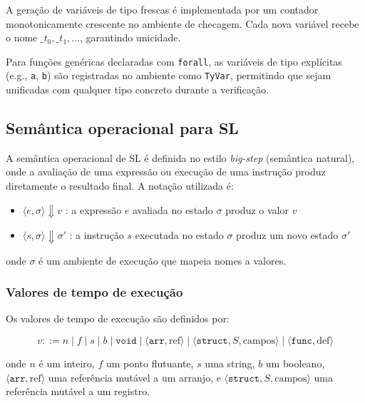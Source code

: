 \documentclass[12pt,a4paper]{article}
\begin{document}
A geração de variáveis de tipo frescas é implementada por um contador monotonicamente crescente no ambiente de checagem. Cada nova variável recebe o nome $\_t_0, \_t_1, \ldots$, garantindo unicidade.

Para funções genéricas declaradas com \texttt{forall}, as variáveis de tipo explícitas (e.g., \texttt{a}, \texttt{b}) são registradas no ambiente como \texttt{TyVar}, permitindo que sejam unificadas com qualquer tipo concreto durante a verificação.

\subsection{Semântica operacional para SL}

A semântica operacional de SL é definida no estilo \textit{big-step} (semântica natural), onde a avaliação de uma expressão ou execução de uma instrução produz diretamente o resultado final. A notação utilizada é:

\begin{itemize}
    \item $\langle e, \sigma \rangle \Downarrow v$ : a expressão $e$ avaliada no estado $\sigma$ produz o valor $v$
    \item $\langle s, \sigma \rangle \Downarrow \sigma'$ : a instrução $s$ executada no estado $\sigma$ produz um novo estado $\sigma'$
\end{itemize}

\noindent onde $\sigma$ é um ambiente de execução que mapeia nomes a valores.

\subsubsection{Valores de tempo de execução}

Os valores de tempo de execução são definidos por:

\[
v ::= n \mid f \mid s \mid b \mid \texttt{void} \mid \langle\texttt{arr}, \text{ref}\rangle \mid \langle\texttt{struct}, S, \text{campos}\rangle \mid \langle\texttt{func}, \text{def}\rangle
\]

\noindent onde $n$ é um inteiro, $f$ um ponto flutuante, $s$ uma string, $b$ um booleano, $\langle\texttt{arr}, \text{ref}\rangle$ uma referência mutável a um arranjo, e $\langle\texttt{struct}, S, \text{campos}\rangle$ uma referência mutável a um registro.
\end{document}
